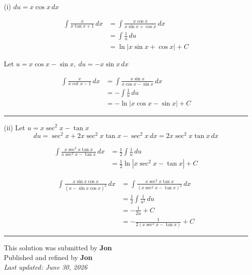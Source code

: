 \documentclass[12pt]{article}
\begin{document}
\newcommand{\ds}{\displaystyle}
(i) $du=x\cos x\,dx$

\begin{align*}\int \frac{x}{x\tan x+1}\,dx
&=\int \frac{x\cos x}{x\sin x+\cos x}\,dx\\
&=\int \frac1u\,du\\
&=\ln|x\sin x+\cos x|+C
\end{align*}

Let $u=x\cos x-\sin x,\  du=-x\sin x\,dx$

\begin{align*}
\int \frac{x}{x\cot x-1}\,dx&=\int \frac{x\sin x}{x\cos x-\sin x}\,dx\\
&=-\int \frac1u\,du\\
&=-\ln|x\cos x-\sin x|+C
\end{align*}

\bigskip\hrule\bigskip

(ii) Let $u=x\sec^2x-\tan x$
$$du=\sec^2x+2x\sec^2x\tan x-\sec^2x\,dx
=2x\sec^2x\tan x\,dx$$

\begin{align*}\int \frac{x\sec^2x\tan x}{x\sec^2x-\tan x}\,dx
&=\frac12\int \frac1u\,du\\
&=\frac12\ln|x\sec^2x-\tan x|+C
\end{align*}


\begin{align*}
\int \frac{x\sin x\cos x}{(x-\sin x\cos x)^2}\,dx
&=\int \frac{x\sec^2x\tan x}{(x\sec^2x-\tan x)^2}\,dx\\
&=\frac12\int \frac1{u^2}\,du\\
&=-\frac1{2u}+C\\
&=-\frac{1}{2(x\sec^2x-\tan x)}+C
\end{align*}

\bigskip
\hrule
\begin{center}
    This solution was submitted by \textbf{Jon}\\[4pt]
    Published and refined by \textbf{Jon}\\[8pt]
    \textit{Last updated: June 30, 2026}
\end{center}
\end{document}
